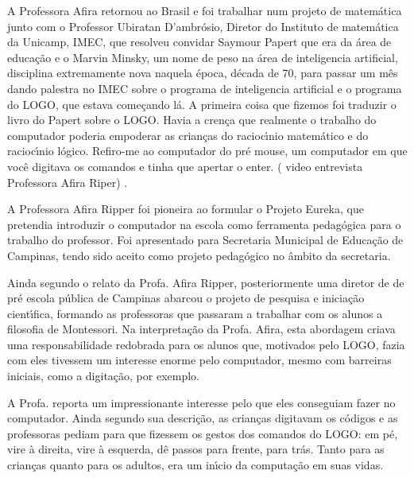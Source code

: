 \documentclass[
12pt,		%
openright,	%
twoside,  %
a4paper,			%
chapter=TITLE,		%
english,			%
french,				%
spanish,			%
brazil				%
]{USPSC-classe/USPSC}
\begin{document}
A Professora Afira  retornou ao  Brasil e foi trabalhar num  projeto de matem\'atica junto com o Professor  Ubiratan D’ambr\'osio, Diretor do  Instituto de matem\'atica da Unicamp, IMEC, que resolveu convidar Saymour Papert que era da \'area de educa\c{c}\~ao e o Marvin Minsky,  um nome de peso na \'area de inteligencia artificial, disciplina extremamente nova naquela \'epoca, d\'ecada de 70, para passar um m\^es dando palestra  no IMEC sobre o programa de inteligencia artificial e o programa do LOGO, que estava come\c{c}ando l\'a.  A primeira coisa que fizemos foi traduzir o livro do Papert sobre o LOGO.  Havia a cren\c{c}a que realmente o trabalho do computador  poderia empoderar as crian\c{c}as do racioc\'{\i}nio matem\'atico e do racioc\'{\i}nio l\'ogico. Refiro-me ao computador do pr\'e mouse, um computador  em que voc\^e digitava os comandos e tinha que apertar o enter. ( video entrevista Professora Afira Riper) .\textquotedbl 










A Professora Afira Ripper foi pioneira ao formular o Projeto Eureka, que pretendia introduzir o computador na escola como ferramenta pedag\'ogica para o trabalho do professor. Foi apresentado para  Secretaria Municipal de Educa\c{c}\~ao de Campinas, tendo sido aceito como projeto pedag\'ogico no \^ambito da secretaria.










Ainda segundo o relato da Profa. Afira Ripper, posteriormente uma diretor de de pr\'e escola p\'ublica de Campinas abarcou  o projeto de pesquisa e inicia\c{c}\~ao cient\'{\i}fica, formando as professoras que passaram a trabalhar com os alunos  a filosofia de Montessori. Na interpreta\c{c}\~ao da Profa. Afira, esta abordagem criava uma responsabilidade redobrada para os alunos que, motivados pelo LOGO, fazia com eles tivessem um interesse enorme pelo computador, mesmo com barreiras iniciais, como a digita\c{c}\~ao, por exemplo.










A Profa. reporta um impressionante interesse pelo que eles conseguiam fazer no computador. Ainda segundo sua descri\c{c}\~ao, as crian\c{c}as digitavam  os c\'odigos e as professoras pediam para que fizessem os gestos dos comandos do LOGO: \textquotedbl em p\'e\textquotedbl , \textquotedbl vire \`a direita\textquotedbl , \textquotedbl vire \`a esquerda\textquotedbl , \textquotedbl d\^e passos para frente\textquotedbl , \textquotedbl para tr\'as\textquotedbl . Tanto para as crian\c{c}as quanto para os adultos, era um in\'{\i}cio da computa\c{c}\~ao em suas vidas.
\end{document}
